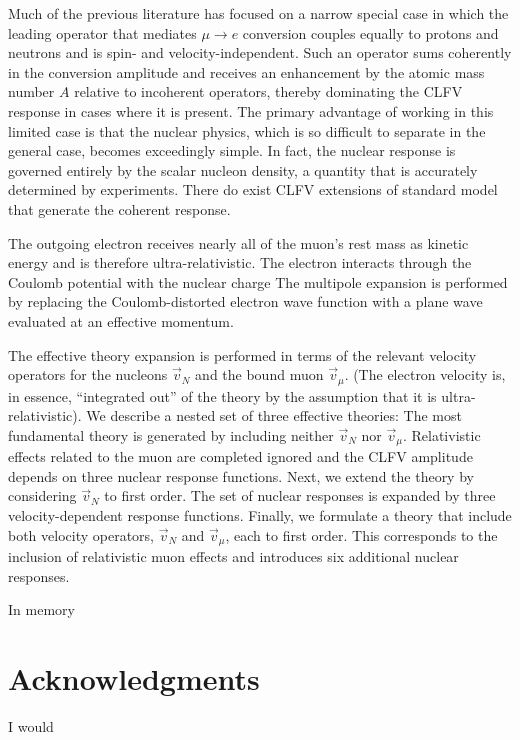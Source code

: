 \documentclass{book}[letterpaper,12pt]
\renewcommand{\headrulewidth}{0pt}
\begin{document}
Much of the previous literature has focused on a narrow special case in which the leading operator that mediates $\mu\rightarrow e$ conversion couples equally to protons and neutrons and is spin- and velocity-independent. Such an operator sums coherently in the conversion amplitude and receives an enhancement by the atomic mass number $A$ relative to incoherent operators, thereby dominating the CLFV response in cases where it is present. The primary advantage of working in this limited case is that the nuclear physics, which is so difficult to separate in the general case, becomes exceedingly simple. In fact, the nuclear response is governed entirely by the scalar nucleon density, a quantity that is accurately determined by experiments. There do exist CLFV extensions of standard model that generate the coherent response.

The outgoing electron receives nearly all of the muon's rest mass as kinetic energy and is therefore ultra-relativistic. The electron interacts through the Coulomb potential with the nuclear charge The multipole expansion is performed by replacing the Coulomb-distorted electron wave function with a plane wave evaluated at an effective momentum. 

The effective theory expansion is performed in terms of the relevant velocity operators for the nucleons $\vec{v}_N$ and the bound muon $\vec{v}_{\mu}$. (The electron velocity is, in essence, ``integrated out'' of the theory by the assumption that it is ultra-relativistic). We describe a nested set of three effective theories: The most fundamental theory is generated by including neither $\vec{v}_N$ nor $\vec{v}_{\mu}$. Relativistic effects related to the muon are completed ignored and the CLFV amplitude depends on three nuclear response functions. Next, we extend the theory by considering $\vec{v}_N$ to first order. The set of nuclear responses is expanded by three velocity-dependent response functions. Finally, we formulate a theory that include both velocity operators, $\vec{v}_N$ and $\vec{v}_{\mu}$, each to first order. This corresponds to the inclusion of relativistic muon effects and introduces six additional nuclear responses.  



\frontmatter
\vspace*{10cm}
In memory
\tableofcontents
\listoffigures
\listoftables
\chapter*{\centering Acknowledgments}
I would
\mainmatter
\fancyhead[L]{\leftmark}
\end{document}
